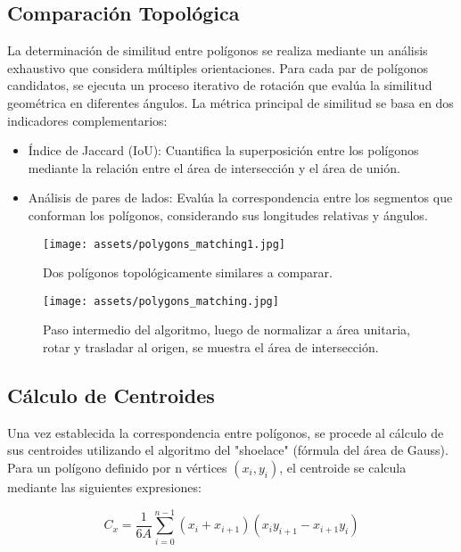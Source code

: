 \documentclass[twocolumn, fontsize=10pt]{article}
\begin{document}
\subsection{Comparación Topológica}

La determinación de similitud entre polígonos se realiza mediante un análisis exhaustivo que considera múltiples orientaciones. Para cada par de polígonos candidatos, se ejecuta un proceso iterativo de rotación que evalúa la similitud geométrica en diferentes ángulos. La métrica principal de similitud se basa en dos indicadores complementarios:

\begin{itemize}
    \item Índice de Jaccard (IoU): \cite{jaccard} Cuantifica la superposición entre los polígonos mediante la relación entre el área de intersección y el área de unión.
    \item Análisis de pares de lados: Evalúa la correspondencia entre los segmentos que conforman los polígonos, considerando sus longitudes relativas y ángulos.
\end{itemize}

\begin{figure}[H]
    \centering
    \texttt{[image: assets/polygons\_matching1.jpg]}
    \caption{Dos polígonos topológicamente similares a comparar.}
    \label{fig:polygons_matching1}
\end{figure}

\begin{figure}[H]
    \centering
    \texttt{[image: assets/polygons\_matching.jpg]}
    \caption{Paso intermedio del algoritmo, luego de normalizar a área unitaria, rotar y trasladar al origen, se muestra el área de intersección.}
    \label{fig:polygons_matching}
\end{figure}

\subsection{Cálculo de Centroides}

Una vez establecida la correspondencia entre polígonos, se procede al cálculo de sus centroides utilizando el algoritmo del "shoelace" \cite{shoelace} (fórmula del área de Gauss). Para un polígono definido por n vértices $(x_i, y_i)$, el centroide se calcula mediante las siguientes expresiones:

\begin{equation*}
    C_x = \frac{1}{6A} \sum_{i=0}^{n-1} (x_i + x_{i+1})(x_i y_{i+1} - x_{i+1} y_i)
\end{equation*}
\end{document}
